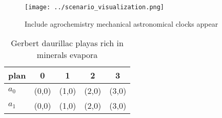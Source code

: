 \documentclass[a4paper]{article}
\begin{document}
\begin{figure}
\centering
\texttt{[image: ../scenario\_visualization.png]}
\caption{Include agrochemistry mechanical astronomical clocks appear
}
\end{figure}
 
\begin{table}
\begin{adjustbox}{width=0.7\columnwidth}
\begin{tabular}{|l|l|l|l|l|}
\hline
\textbf{plan} & \multicolumn{1}{c|}{\textbf{0}} & \multicolumn{1}{c|}{\textbf{1}} & \multicolumn{1}{c|}{\textbf{2}} & \multicolumn{1}{c|}{\textbf{3}} \\ \hline
\textbf{$a_0$}  & (0,0) & (1,0) & (2,0) & (3,0) \\ \hline
\textbf{$a_1$}  & (0,0) & (1,0) & (2,0) & (3,0) \\ \hline
\end{tabular}
\end{adjustbox}
\caption{Gerbert daurillac playas rich in minerals evapora
}
\end{table}
\end{document}

